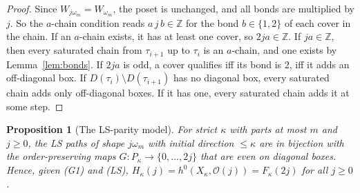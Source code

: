 \documentclass[11pt]{amsart}
\newtheorem{proposition}[theorem]{Proposition}
\theoremstyle{definition}
\theoremstyle{remark}
\newcommand{\cO}{\mathcal{O}}
\newcommand{\Z}{\mathbb{Z}}
\begin{document}
\begin{proof}
Since $W_{j\omega_m}=W_{\omega_m}$, the poset is unchanged, and all bonds are multiplied by
$j$. So the $a$-chain condition reads $a\,j\,b\in\Z$ for the bond $b\in\{1,2\}$ of each cover
in the chain. If an $a$-chain exists, it has at least one cover, so $2ja\in\Z$. If $ja\in\Z$,
then every saturated chain from $\tau_{i+1}$ up to $\tau_i$ is an $a$-chain, and one exists by
Lemma~\ref{lem:bonds}. If $2ja$ is odd, a cover qualifies iff its bond is $2$, iff it adds an
off-diagonal box. If $D(\tau_i)\setminus D(\tau_{i+1})$ has no diagonal box, every saturated
chain adds only off-diagonal boxes. If it has one, every saturated chain adds it at some
step.
\end{proof}

\begin{proposition}[The LS-parity model]\label{prop:model}
For strict $\kappa$ with parts at most $m$ and $j\ge0$, the LS paths of shape $j\omega_m$
with initial direction $\le\kappa$ are in bijection with the order-preserving maps
$G\colon P_\kappa\to\{0,\dots,2j\}$ that are even on diagonal boxes. Hence, given (G1) and
(LS), $H_\kappa(j)=h^0(X_\kappa,\cO(j))=F_\kappa(2j)$ for all $j\ge0$.
\end{proposition}
\end{document}
